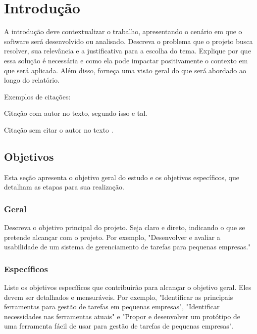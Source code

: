 \chapter{Introdução}

A introdução deve contextualizar o trabalho, apresentando o cenário em que o software será desenvolvido ou analisado. Descreva o problema que o projeto busca resolver, sua relevância e a justificativa para a escolha do tema. Explique por que essa solução é necessária e como ela pode impactar positivamente o contexto em que será aplicada. Além disso, forneça uma visão geral do que será abordado ao longo do relatório.

Exemplos de citações:

Citação com autor no texto, segundo \textcite{araujo2012} isso e tal.

Citação sem citar o autor no texto \cite{araujo2012}.




\section{Objetivos}

Esta seção apresenta o objetivo geral do estudo e os objetivos específicos, que detalham as etapas para sua realização.

\subsection{Geral}

Descreva o objetivo principal do projeto. Seja claro e direto, indicando o que se pretende alcançar com o projeto. Por exemplo, "Desenvolver e avaliar a usabilidade de um sistema de gerenciamento de tarefas para pequenas empresas."

\subsection{Específicos}

Liste os objetivos específicos que contribuirão para alcançar o objetivo geral. Eles devem ser detalhados e mensuráveis. Por exemplo, "Identificar as principais ferramentas para gestão de tarefas em pequenas empresas", "Identificar necessidades nas ferramentas atuais" e "Propor e desenvolver um protótipo de uma ferramenta fácil de usar para gestão de tarefas de pequenas empresas".
